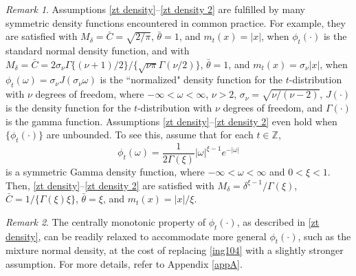 \documentclass[ejsv2]{imsart}
\theoremstyle{plain}
\theoremstyle{definition}
\theoremstyle{remark}
\newtheorem{remark}{Remark}[section]
\begin{document}
\begin{remark}\label{rm2.0}
Assumptions \eqref{zt density}--\eqref{zt density 2} are fulfilled by many symmetric density functions encountered in common practice.
For example,
they are satisfied with $M_\delta=\bar{C}=\sqrt{2/\pi}$, $\bar{\theta}=1$, and
$m_t(x)=|x|$,
when $\phi_t(\cdot)$ is the standard normal density function,
and with
$M_\delta=\bar{C}=2\sigma_\nu\Gamma\{(\nu+1)/2\}/\{\sqrt{\nu\pi}\Gamma(\nu/2)\}$,
$\bar{\theta}=1$, and
$m_t(x)=\sigma_\nu |x|$,
when $\phi_t(\omega)=\sigma_\nu J(\sigma_\nu \omega)$
is the ``normalized" density function for the $t$-distribution
with $\nu$ degrees of freedom,
where $-\infty<\omega<\infty$, $\nu>2$,
$\sigma_\nu=\sqrt{\nu/(\nu-2)}$,
$J(\cdot)$ is the
density function for the $t$-distribution
with $\nu$ degrees of freedom, and
$\Gamma(\cdot)$ is the gamma function.
Assumptions \eqref{zt density}--\eqref{zt density 2} even hold when $\{\phi_t(\cdot)\}$
are unbounded. To see this, assume that for each $t \in \mathbb{Z}$,
$$\phi_t(\omega)=\frac{1}{2\Gamma(\xi)}|\omega|^{\xi-1}e^{-|\omega|}$$
is a symmetric Gamma density function, where $-\infty< \omega <\infty$ and $0<\xi<1$. Then,
\eqref{zt density}--\eqref{zt density 2} are satisfied with $M_\delta=\delta^{\xi-1}/\Gamma(\xi)$, $\bar{C}=1/\{\Gamma(\xi)\xi\}$, $\bar{\theta}=\xi$,
and $m_t(x)=|x|/\xi$.
\end{remark}

\begin{remark}\label{rm2.1}
The centrally monotonic property of 
$\phi_t(\cdot)$, as described in
\eqref{zt density}, can be readily relaxed to accommodate more general $\phi_t(\cdot)$, such as the mixture normal density, 
at the cost of replacing \eqref{ing104} with a slightly stronger assumption. For more details, refer to Appendix \ref{appA}.
\end{remark}
\end{document}
